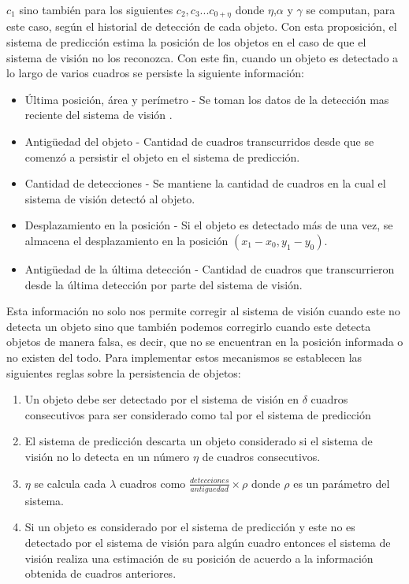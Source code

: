 $c_1$ sino también para los siguientes $c_2,c_3 ... c_{0+\eta}$ donde 
$\eta$,$\alpha$ y $\gamma$ se computan, para este caso, según el 
historial de detección de cada objeto.  Con esta proposición, el 
sistema de predicción estima la posición de los objetos en el caso de 
que el sistema de visión no los reconozca. Con este fin, cuando un objeto es detectado a lo largo de varios cuadros se persiste la siguiente información:
\begin{itemize}
\item{ Última posición, área y perímetro - Se toman los datos de la detección mas reciente del sistema de visión .}
\item{ Antigüedad del objeto - Cantidad de cuadros transcurridos desde que se comenzó a persistir el objeto en el sistema de predicción.}
\item{ Cantidad de detecciones - Se mantiene la cantidad de cuadros en la cual el sistema de visión detectó al objeto.}
\item{ Desplazamiento en la posición - Si el objeto es detectado más 
de una vez, se almacena el desplazamiento en la posición $(x_1 - x_0 , y_1 - y_0 )$.}
\item{ Antigüedad de la última detección - Cantidad de cuadros que transcurrieron desde la última detección por parte del sistema de visión.}  
\end{itemize}
Esta información no solo nos permite corregir al sistema de visión 
cuando este no detecta un objeto sino que también podemos corregirlo 
cuando este detecta objetos de manera falsa, es decir, que no se 
encuentran en la posición informada o no existen del todo. Para 
implementar estos mecanismos se establecen las siguientes reglas sobre 
la persistencia de objetos:
\begin{enumerate}
\item{Un objeto debe ser detectado por el sistema de visión en $\delta$ 
cuadros consecutivos para ser considerado como tal por el sistema de 
predicción}
\item{El sistema de predicción descarta un objeto considerado si el 
sistema de visión no lo detecta en un número $\eta$ de cuadros 
consecutivos.}
\item{ $\eta$ se calcula cada $\lambda$ cuadros como 
$\frac{detecciones}{antiguedad}\times \rho$ donde $\rho$ es un parámetro del 
sistema}.
\item{ Si un objeto es considerado por el sistema de predicción y este 
no es detectado por el sistema de visión para algún cuadro entonces 
el sistema de visión realiza una estimación de su posición de 
acuerdo a la información obtenida de cuadros anteriores.}
\end{enumerate}

